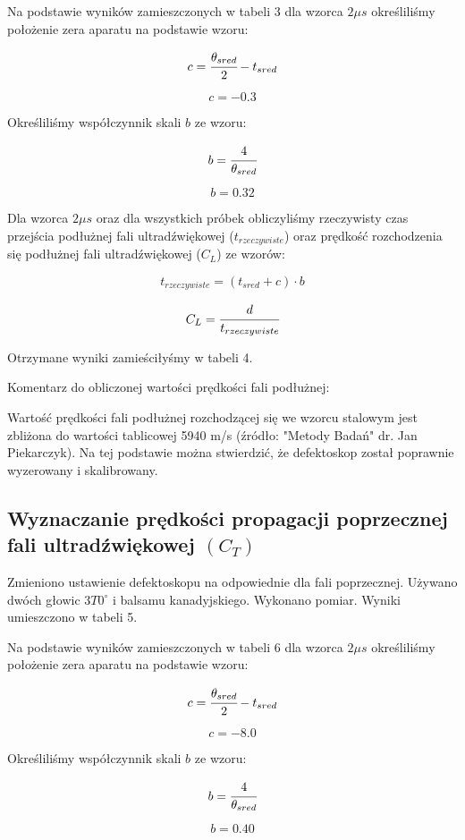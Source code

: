 \documentclass[a4paper,12pt]{article}
\begin{document}
Na podstawie wyników zamieszczonych w tabeli 3 dla wzorca $2\mu s$ określiliśmy położenie zera aparatu na podstawie wzoru:

$$c=\cfrac{\theta _{sred}}{2}-t_{sred}$$

$$c=-0.3$$

Określiliśmy współczynnik skali $b$ ze wzoru:

$$b=\cfrac{4}{\theta _{sred}}$$

$$b=0.32$$

Dla wzorca $2\mu s$ oraz dla wszystkich próbek obliczyliśmy rzeczywisty czas przejścia podłużnej fali ultradźwiękowej ($t_{rzeczywiste}$) oraz prędkość rozchodzenia się podłużnej fali ultradźwiękowej ($C_L$) ze wzorów:

$$t_{rzeczywiste}=(t_{sred}+c)\cdot b$$

$$C_L=\cfrac{d}{t_{rzeczywiste}}$$

Otrzymane wyniki zamieściłyśmy w tabeli 4.



Komentarz do obliczonej wartości prędkości fali podłużnej:

Wartość prędkości fali podłużnej rozchodzącej się we wzorcu stalowym jest zbliżona do wartości tablicowej 5940 m/s (źródło: "Metody Badań" dr. Jan Piekarczyk). Na tej podstawie można stwierdzić, że defektoskop został poprawnie wyzerowany i skalibrowany. 


\subsection{Wyznaczanie prędkości propagacji poprzecznej fali ultradźwiękowej $(C_T)$}

Zmieniono ustawienie defektoskopu na odpowiednie dla fali poprzecznej. Używano dwóch głowic $3T0^\circ$  i balsamu kanadyjskiego. Wykonano pomiar. Wyniki umieszczono w tabeli 5. 





Na podstawie wyników zamieszczonych w tabeli 6 dla wzorca $2\mu s$ określiliśmy położenie zera aparatu na podstawie wzoru:

$$c=\cfrac{\theta _{sred}}{2}-t_{sred}$$

$$c=-8.0$$

Określiliśmy współczynnik skali $b$ ze wzoru:

$$b=\cfrac{4}{\theta _{sred}}$$

$$b=0.40$$
\end{document}
